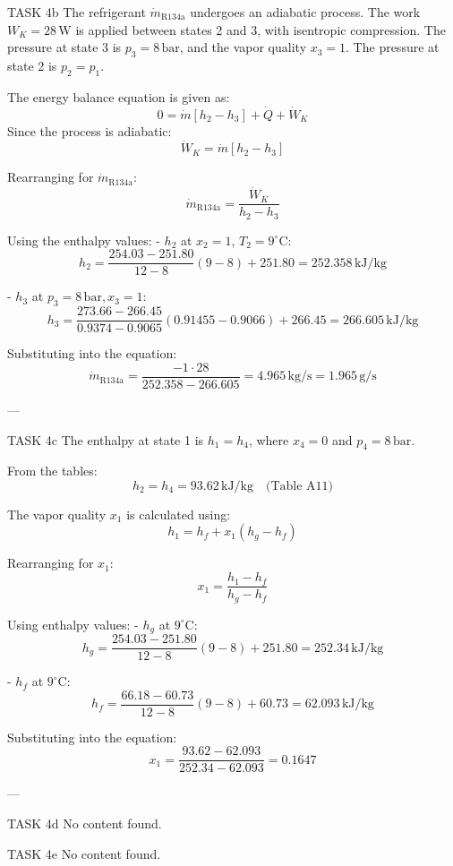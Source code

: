 TASK 4b  
The refrigerant \( \dot{m}_{\text{R134a}} \) undergoes an adiabatic process. The work \( W_K = 28 \, \text{W} \) is applied between states 2 and 3, with isentropic compression. The pressure at state 3 is \( p_3 = 8 \, \text{bar} \), and the vapor quality \( x_3 = 1 \). The pressure at state 2 is \( p_2 = p_1 \).  

The energy balance equation is given as:  
\[
0 = \dot{m} \left[ h_2 - h_3 \right] + \dot{Q} + \dot{W}_K
\]  
Since the process is adiabatic:  
\[
\dot{W}_K = \dot{m} \left[ h_2 - h_3 \right]
\]  

Rearranging for \( \dot{m}_{\text{R134a}} \):  
\[
\dot{m}_{\text{R134a}} = \frac{\dot{W}_K}{h_2 - h_3}
\]  

Using the enthalpy values:  
- \( h_2 \) at \( x_2 = 1 \), \( T_2 = 9^\circ\text{C} \):  
\[
h_2 = \frac{254.03 - 251.80}{12 - 8} (9 - 8) + 251.80 = 252.358 \, \text{kJ/kg}
\]  

- \( h_3 \) at \( p_3 = 8 \, \text{bar}, x_3 = 1 \):  
\[
h_3 = \frac{273.66 - 266.45}{0.9374 - 0.9065} (0.91455 - 0.9066) + 266.45 = 266.605 \, \text{kJ/kg}
\]  

Substituting into the equation:  
\[
\dot{m}_{\text{R134a}} = \frac{-1 \cdot 28}{252.358 - 266.605} = 4.965 \, \text{kg/s} = 1.965 \, \text{g/s}
\]  

---

TASK 4c  
The enthalpy at state 1 is \( h_1 = h_4 \), where \( x_4 = 0 \) and \( p_4 = 8 \, \text{bar} \).  

From the tables:  
\[
h_2 = h_4 = 93.62 \, \text{kJ/kg} \quad \text{(Table A11)}
\]  

The vapor quality \( x_1 \) is calculated using:  
\[
h_1 = h_f + x_1 (h_g - h_f)
\]  

Rearranging for \( x_1 \):  
\[
x_1 = \frac{h_1 - h_f}{h_g - h_f}
\]  

Using enthalpy values:  
- \( h_g \) at \( 9^\circ\text{C} \):  
\[
h_g = \frac{254.03 - 251.80}{12 - 8} (9 - 8) + 251.80 = 252.34 \, \text{kJ/kg}
\]  

- \( h_f \) at \( 9^\circ\text{C} \):  
\[
h_f = \frac{66.18 - 60.73}{12 - 8} (9 - 8) + 60.73 = 62.093 \, \text{kJ/kg}
\]  

Substituting into the equation:  
\[
x_1 = \frac{93.62 - 62.093}{252.34 - 62.093} = 0.1647
\]  

---

TASK 4d  
No content found.  

TASK 4e  
No content found.  